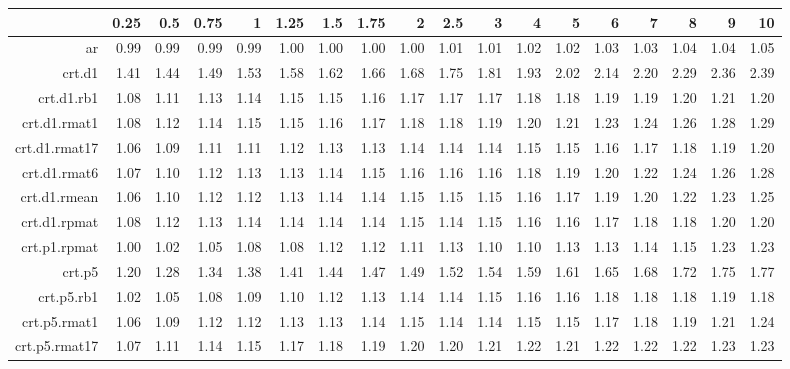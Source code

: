 \begin{tabular}{rrrrrrrrrrrrrrrrrr}
  \hline
 & 0.25 & 0.5 & 0.75 & 1 & 1.25 & 1.5 & 1.75 & 2 & 2.5 & 3 & 4 & 5 & 6 & 7 & 8 & 9 & 10 \\ 
  \hline
ar & 0.99 & 0.99 & 0.99 & 0.99 & 1.00 & 1.00 & 1.00 & 1.00 & 1.01 & 1.01 & 1.02 & 1.02 & 1.03 & 1.03 & 1.04 & 1.04 & 1.05 \\ 
  crt.d1 & 1.41 & 1.44 & 1.49 & 1.53 & 1.58 & 1.62 & 1.66 & 1.68 & 1.75 & 1.81 & 1.93 & 2.02 & 2.14 & 2.20 & 2.29 & 2.36 & 2.39 \\ 
  crt.d1.rb1 & 1.08 & 1.11 & 1.13 & 1.14 & 1.15 & 1.15 & 1.16 & 1.17 & 1.17 & 1.17 & 1.18 & 1.18 & 1.19 & 1.19 & 1.20 & 1.21 & 1.20 \\ 
  crt.d1.rmat1 & 1.08 & 1.12 & 1.14 & 1.15 & 1.15 & 1.16 & 1.17 & 1.18 & 1.18 & 1.19 & 1.20 & 1.21 & 1.23 & 1.24 & 1.26 & 1.28 & 1.29 \\ 
  crt.d1.rmat17 & 1.06 & 1.09 & 1.11 & 1.11 & 1.12 & 1.13 & 1.13 & 1.14 & 1.14 & 1.14 & 1.15 & 1.15 & 1.16 & 1.17 & 1.18 & 1.19 & 1.20 \\ 
  crt.d1.rmat6 & 1.07 & 1.10 & 1.12 & 1.13 & 1.13 & 1.14 & 1.15 & 1.16 & 1.16 & 1.16 & 1.18 & 1.19 & 1.20 & 1.22 & 1.24 & 1.26 & 1.28 \\ 
  crt.d1.rmean & 1.06 & 1.10 & 1.12 & 1.12 & 1.13 & 1.14 & 1.14 & 1.15 & 1.15 & 1.15 & 1.16 & 1.17 & 1.19 & 1.20 & 1.22 & 1.23 & 1.25 \\ 
  crt.d1.rpmat & 1.08 & 1.12 & 1.13 & 1.14 & 1.14 & 1.14 & 1.14 & 1.15 & 1.14 & 1.15 & 1.16 & 1.16 & 1.17 & 1.18 & 1.18 & 1.20 & 1.20 \\ 
  crt.p1.rpmat & 1.00 & 1.02 & 1.05 & 1.08 & 1.08 & 1.12 & 1.12 & 1.11 & 1.13 & 1.10 & 1.10 & 1.13 & 1.13 & 1.14 & 1.15 & 1.23 & 1.23 \\ 
  crt.p5 & 1.20 & 1.28 & 1.34 & 1.38 & 1.41 & 1.44 & 1.47 & 1.49 & 1.52 & 1.54 & 1.59 & 1.61 & 1.65 & 1.68 & 1.72 & 1.75 & 1.77 \\ 
  crt.p5.rb1 & 1.02 & 1.05 & 1.08 & 1.09 & 1.10 & 1.12 & 1.13 & 1.14 & 1.14 & 1.15 & 1.16 & 1.16 & 1.18 & 1.18 & 1.18 & 1.19 & 1.18 \\ 
  crt.p5.rmat1 & 1.06 & 1.09 & 1.12 & 1.12 & 1.13 & 1.13 & 1.14 & 1.15 & 1.14 & 1.14 & 1.15 & 1.15 & 1.17 & 1.18 & 1.19 & 1.21 & 1.24 \\ 
  crt.p5.rmat17 & 1.07 & 1.11 & 1.14 & 1.15 & 1.17 & 1.18 & 1.19 & 1.20 & 1.20 & 1.21 & 1.22 & 1.21 & 1.22 & 1.22 & 1.22 & 1.23 & 1.23 \\ 

\end{tabular}
